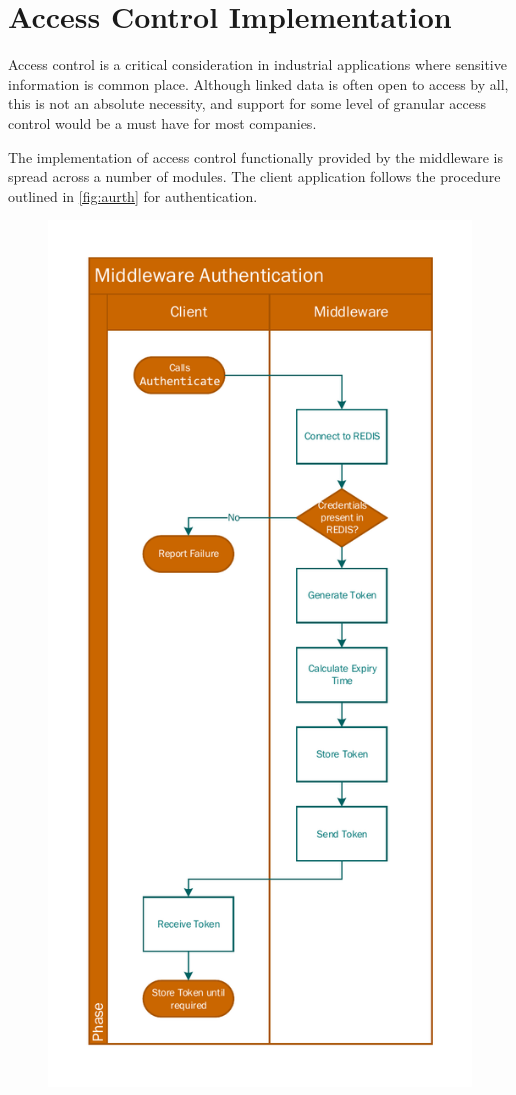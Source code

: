 \section{Access Control Implementation}
Access control is a critical consideration in industrial applications where sensitive information is common place. Although linked data is often open to access by all, this is not an absolute necessity, and support for some level of granular access control would be a must have for most companies.

The implementation of access control functionally provided by the middleware is spread across a number of modules. The client application follows the procedure outlined in \autoref{fig:aurth} for authentication.

 \begin{figure}[!htbp]
\myfloatalign
{\includegraphics[width=\linewidth]{gfx/MiddlewareAurthentication}} 

\end{figure}

